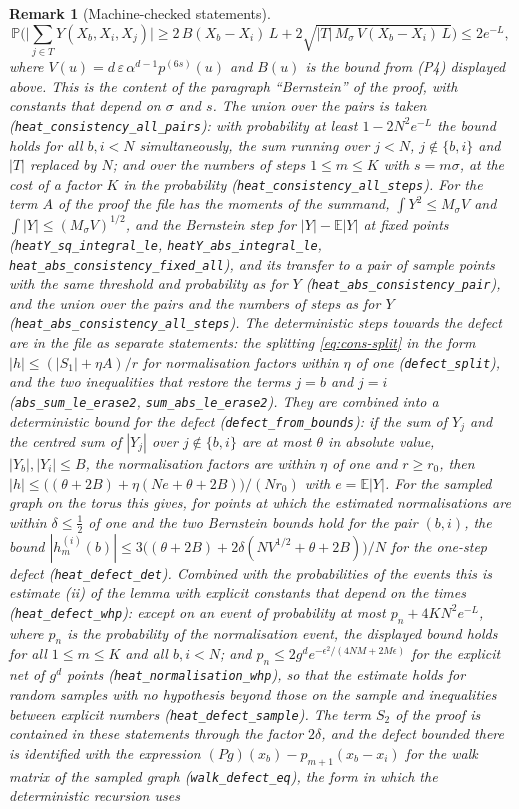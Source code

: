 \documentclass[11pt,a4paper]{article}
\theoremstyle{stmt}
\theoremstyle{defn}
\theoremstyle{rmk}
\newtheorem{remark}[theorem]{Remark}
\numberwithin{equation}{section}
\begin{document}
{\begin{remark}[Machine-checked statements]
\[
\mathbb P\Big(\Big|\sum_{j\in T}Y(X_b,X_i,X_j)\Big|\ge2\,B(X_b-X_i)\,L+2\sqrt{|T|\,M_\sigma\,V(X_b-X_i)\,L}\Big)\le2e^{-L},
\]
where $V(u)=d\,\varepsilon\,\alpha^{d-1}p^{(6s)}(u)$ and $B(u)$ is the bound from (P4) displayed above. This is the content of the paragraph ``Bernstein'' of the proof, with constants that depend on $\sigma$ and $s$. The union over the pairs is taken (\texttt{heat\_consistency\_all\_pairs}): with probability at least $1-2N^2e^{-L}$ the bound holds for all $b,i<N$ simultaneously, the sum running over $j<N$, $j\notin\{b,i\}$ and $|T|$ replaced by $N$; and over the numbers of steps $1\le m\le K$ with $s=m\sigma$, at the cost of a factor $K$ in the probability (\texttt{heat\_consistency\_all\_steps}). For the term $A$ of the proof the file has the moments of the summand, $\int Y^2\le M_\sigma V$ and $\int|Y|\le(M_\sigma V)^{1/2}$, and the Bernstein step for $|Y|-\mathbb E|Y|$ at fixed points (\texttt{heatY\_sq\_integral\_le}, \texttt{heatY\_abs\_integral\_le}, \texttt{heat\_abs\_consistency\_fixed\_all}), and its transfer to a pair of sample points with the same threshold and probability as for $Y$ (\texttt{heat\_abs\_consistency\_pair}), and the union over the pairs and the numbers of steps as for $Y$ (\texttt{heat\_abs\_consistency\_all\_steps}). The deterministic steps towards the defect are in the file as separate statements: the splitting \eqref{eq:cons-split} in the form $|h|\le(|S_1|+\eta A)/r$ for normalisation factors within $\eta$ of one (\texttt{defect\_split}), and the two inequalities that restore the terms $j=b$ and $j=i$ (\texttt{abs\_sum\_le\_erase2}, \texttt{sum\_abs\_le\_erase2}). They are combined into a deterministic bound for the defect (\texttt{defect\_from\_bounds}): if the sum of $Y_j$ and the centred sum of $|Y_j|$ over $j\notin\{b,i\}$ are at most $\theta$ in absolute value, $|Y_b|,|Y_i|\le B$, the normalisation factors are within $\eta$ of one and $r\ge r_0$, then $|h|\le\big((\theta+2B)+\eta(Ne+\theta+2B)\big)/(Nr_0)$ with $e=\mathbb E|Y|$. For the sampled graph on the torus this gives, for points at which the estimated normalisations are within $\delta\le\frac12$ of one and the two Bernstein bounds hold for the pair $(b,i)$, the bound $|h^{(i)}_m(b)|\le3\big((\theta+2B)+2\delta(NV^{1/2}+\theta+2B)\big)/N$ for the one-step defect (\texttt{heat\_defect\_det}). Combined with the probabilities of the events this is estimate (ii) of the lemma with explicit constants that depend on the times (\texttt{heat\_defect\_whp}): except on an event of probability at most $p_n+4KN^2e^{-L}$, where $p_n$ is the probability of the normalisation event, the displayed bound holds for all $1\le m\le K$ and all $b,i<N$; and $p_n\le2g^de^{-\epsilon^2/(4NM+2M\epsilon)}$ for the explicit net of $g^d$ points (\texttt{heat\_normalisation\_whp}), so that the estimate holds for random samples with no hypothesis beyond those on the sample and inequalities between explicit numbers (\texttt{heat\_defect\_sample}). The term $S_2$ of the proof is contained in these statements through the factor $2\delta$, and the defect bounded there is identified with the expression $(Pg)(x_b)-p_{m+1}(x_b-x_i)$ for the walk matrix of the sampled graph (\texttt{walk\_defect\_eq}), the form in which the deterministic recursion uses 
\end{remark}}
\end{document}
